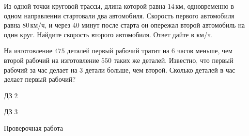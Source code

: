 \begin{homework}[number=1]
\begin{listofex}
		\item Из одной точки круговой трассы, длина которой равна \(14\) км, одновременно в одном направлении стартовали два автомобиля. Скорость первого автомобиля равна \(80\) км/ч, и через \(40\) минут после старта он опережал второй автомобиль на один круг. Найдите скорость второго автомобиля. Ответ дайте в км/ч.
		\item На изготовление \(475\) деталей первый рабочий тратит на \(6\) часов меньше, чем второй рабочий на изготовление \(550\) таких же деталей. Известно, что первый рабочий за час делает на \(3\) детали больше, чем второй. Сколько деталей в час делает первый рабочий?
	\end{listofex}
\end{homework}

\begin{homework}[number=2]
	\begin{listofex}
		\item ДЗ 2
	\end{listofex}
\end{homework}

\begin{homework}[number=3]
	\begin{listofex}
		\item ДЗ 3
	\end{listofex}
\end{homework}

\begin{exam}
	\begin{listofex}
		\item Проверочная работа
	\end{listofex}
\end{exam}
